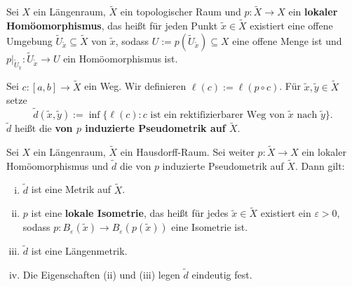 \begin{definition}
\label{def:2.23}
	Sei $X$ ein Längenraum, $\tilde{X}$ ein topologischer Raum und $p \colon \tilde{X} \rightarrow X$ ein \textbf{lokaler Homöomorphismus}, das heißt für jeden Punkt $\tilde{x} \in \tilde{X}$ existiert eine offene Umgebung $\tilde{U}_{\tilde{x}} \subseteq \tilde{X}$ von $\tilde{x}$, sodass $U := p(\tilde{U}_{\tilde{x}}) \subseteq X$ eine offene Menge ist und $p \big|_{\tilde{U}_{\tilde{x}}}\colon \tilde{U}_{\tilde{x}} \rightarrow U$ ein Homöomorphismus ist. 
	
	Sei $c \colon [a,b] \rightarrow \tilde{X}$ ein Weg.
	Wir definieren $\ell(c) := \ell(p \circ c)$.
	Für $\tilde{x}, \tilde{y} \in \tilde{X}$ setze
	\[
		\tilde{d}(\tilde{x},\tilde{y}) := \inf \{ \ell(c) : c \text{ ist ein rektifizierbarer Weg von } \tilde{x} \text{ nach } \tilde{y}\}.
	\]
	$\tilde{d}$ heißt die \textbf{von $p$ induzierte Pseudometrik auf $\tilde{X}$}. 
\end{definition}

\begin{satz}
\label{satz:2.24}
	Sei $X$ ein Längenraum, $\tilde{X}$ ein Hausdorff-Raum.
	Sei weiter $p \colon \tilde{X} \rightarrow X$ ein lokaler Homöomorphismus und $\tilde{d}$ die von $p$ induzierte Pseudometrik auf $\tilde{X}$.
	Dann gilt:
	\begin{enumerate}[(i)]
		\item $\tilde{d}$ ist eine Metrik auf $\tilde{X}$.
		\item $p$ ist eine \textbf{lokale Isometrie}, das heißt für jedes $\tilde{x} \in \tilde{X}$ existiert ein $\varepsilon > 0$, sodass $p \colon B_\varepsilon(\tilde{x}) \rightarrow B_\varepsilon(p(\tilde{x}))$ eine Isometrie ist. 
		\item $\tilde{d}$ ist eine Längenmetrik.
		\item Die Eigenschaften (ii) und (iii) legen $\tilde{d}$ eindeutig fest.
	\end{enumerate}
\end{satz}


\cleardoubleoddemptypage